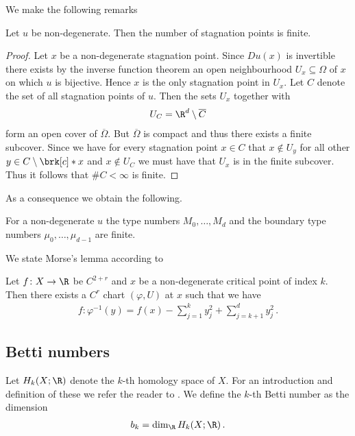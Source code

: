 We make the following remarks
\begin{proposition}
  Let $u$ be non-degenerate. Then the number of
  stagnation points is finite.
\end{proposition}
\begin{proof}
  Let $x$ be a non-degenerate stagnation point. Since $Du(x)$ is invertible there exists
  by the inverse function theorem an open neighbourhood $U_x\subseteq\Omega$ of $x$ on which 
  $u$ is bijective. Hence $x$ is the only stagnation point in $U_x$. Let $C$ denote the set of all
  stagnation points of $u$. Then the sets $U_x$ together with
  \begin{align}
    U_C=\R^d\setminus \overline{C}
  \end{align}
  form an open cover of $\overline{\Omega}$. But $\overline{\Omega}$ is compact and thus there exists
  a finite subcover. Since we have for every stagnation point $x\in C$ that
  $x\not\in U_y$ for all other $y\in C\setminus\brk[c]*{x}$ and $x\not\in U_C$ we must have that $U_x$
  is in the finite subcover. Thus it follows that $\#C<\infty$ is finite.
\end{proof}
As a consequence we obtain the following.
\begin{corollary}
  For a non-degenerate $u$ the type numbers $M_0,\dots,M_d$ and the boundary type numbers $\mu_0,\dots,\mu_{d-1}$
  are finite.
\end{corollary}


We state Morse's lemma according to \cite[p.145]{Hirsch1994}
\begin{lemma}
  Let $f\colon X\to\R$ be $C^{2+r}$ and $x$ be a non-degenerate
  critical point of index $k$. Then there exists a $C^r$ chart $(\varphi,U)$ at $x$
  such that we have
  \begin{align*}
    f\colon\varphi^{-1}(y)=f(x)-\sum_{j=1}^ky_j^2+\sum_{j=k+1}^dy_j^2\,.
  \end{align*}
\end{lemma}


\subsection{Betti numbers}

Let $H_k(X;\R)$ denote the $k$-th homology space of $X$.
For an introduction and definition of these we refer the reader to \cite[Chapter 2]{Hatcher2002}.
We define the $k$-th Betti number as the dimension
\begin{align}
  b_k=\dim_\R H_k(X;\R)\,.\label{eq:df_bettiNbrs}
\end{align}

